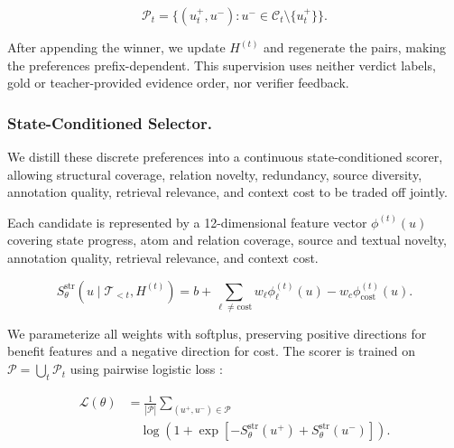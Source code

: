 \documentclass[letterpaper]{article}
\begin{document}
\[
\mathcal P_t=
\{(u_t^+,u^-):
u^-\in\mathcal C_t\setminus\{u_t^+\}\}.
\]

After appending the winner, we update $H^{(t)}$ and regenerate the
pairs, making the preferences prefix-dependent. This supervision uses
neither verdict labels, gold or teacher-provided evidence order, nor
verifier feedback.

\subsubsection{State-Conditioned Selector.}

We distill these discrete preferences into a continuous
state-conditioned scorer, allowing structural coverage, relation
novelty, redundancy, source diversity, annotation quality, retrieval
relevance, and context cost to be traded off jointly.

Each candidate is represented by a 12-dimensional feature vector
$\phi^{(t)}(u)$ covering state progress, atom and relation coverage,
source and textual novelty, annotation quality, retrieval relevance,
and context cost.

\[
S_\theta^{\mathrm{str}}(u\mid\mathcal T_{<t},H^{(t)})
=b+\sum_{\ell\ne\mathrm{cost}}w_\ell\phi_\ell^{(t)}(u)
-w_c\phi_{\mathrm{cost}}^{(t)}(u).
\]

We parameterize all weights with softplus, preserving positive
directions for benefit features and a negative direction for cost.
The scorer is trained on
$\mathcal P=\bigcup_t\mathcal P_t$ using pairwise logistic loss
\citep{Burges2005RankNet}:

\[
\begin{aligned}
\mathcal L(\theta)
&={}\frac{1}{|\mathcal P|}
\sum_{(u^+,u^-)\in\mathcal P}\\
&\quad\log\!\left(1+\exp\!\left[
-S_\theta^{\mathrm{str}}(u^+)+S_\theta^{\mathrm{str}}(u^-)
\right]\right).
\end{aligned}
\]
\end{document}
